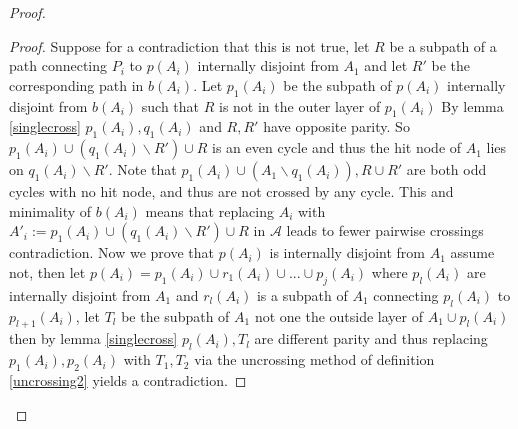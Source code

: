 \documentclass[letterpaper,11pt]{article}
\newtheorem{lemma}[theorem]{Lemma}
\newcommand{\0}{\mathbb{0}}
\newcommand{\1}{\mathbb{1}}
\begin{document}
\begin{proof}
\begin{proof}
Suppose for a contradiction that this is not true,  let $R$ be a subpath of a path connecting $P_i$ to $ p(A_i)  $ internally disjoint from $A_1$  and let $R'$ be the corresponding path in $b(A_i)$. Let $p_1(A_i)$ be the subpath of $p(A_i)$ internally disjoint from $b(A_i)$ such that $R$ is not in the outer layer of $p_1(A_i)$   By lemma \ref{singlecross}  $p_1(A_i) , q_1(A_i) $  and $R,R'$ have opposite parity. So $p_1(A_i) \cup (q_1(A_i) \backslash R') \cup R$ is an even cycle and thus the hit node of $A_1$ lies on $q_1(A_i) \backslash R' $. Note that $p_1(A_i) \cup (A_1 \backslash q_1(A_i)) , R \cup R'$ are both odd cycles with no hit node, and thus are not crossed by any cycle.  This and minimality of $b(A_i)$ means that replacing $A_i$ with $A'_i:= p_1(A_i) \cup (q_1(A_i) \backslash R') \cup R$ in $\mathcal{
A}$ leads to fewer pairwise crossings contradiction. 
Now we prove that $p(A_i)$ is internally disjoint from $A_1$ assume not, then let $p(A_i) = p_1(A_i) \cup r_1(A_i) \cup ... \cup p_j(A_i)$ where $p_l(A_i) $ are internally disjoint from $A_1$ and $r_{l}(A_i)$ is a subpath of $A_1$ connecting $p_l(A_i)$ to $p_{l+1}(A_i)$, let $T_l$ be the subpath of $A_1$ not one the outside layer of $A_1 \cup p_l(A_i) $ then by lemma \ref{singlecross}  $p_l(A_i) , T_l$ are different parity and thus replacing $p_1(A_i) , p_2(A_i)$ with $T_1, T_2$  via the uncrossing method of definition \ref{uncrossing2} yields a contradiction.
\end{proof}



\end{proof}
\end{document}
